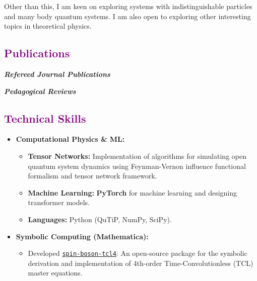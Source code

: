 \documentclass[a4paper,11pt]{article}
\newcommand{\sectionheading}[1]{\subsection*{\textcolor{purple}{#1}}}
\begin{document}
Other than this, I am keen on exploring systems with indistinguishable particles and many body quantum systems. I am also open to exploring other interesting topics in theoretical physics.





\sectionheading{Publications}

\nocite{Kumar2025MF,Kumar2024LHA}

\textbf{\textit{Refereed Journal Publications}}
\printbibliography[heading=none,keyword=refereed]

\textbf{\textit{Pedagogical Reviews}}
\printbibliography[heading=none,keyword=pedagogical]


\sectionheading{Technical Skills}
\begin{itemize}[leftmargin=*]
    \item \textbf{Computational Physics \& ML:} 
    \begin{itemize}
        \item \textbf{Tensor Networks:} Implementation of algorithms for simulating open quantum system dynamics using Feynman-Vernon influence functional formalism and tensor network framework.
        \item \textbf{Machine Learning:} \textbf{PyTorch} for machine learning and designing transformer models.
        \item \textbf{Languages:} Python (QuTiP, NumPy, SciPy).
    \end{itemize}
    \item \textbf{Symbolic Computing (Mathematica):} 
    \begin{itemize}
        \item Developed \href{https://github.com/prem314/spin-boson-tcl4}{\texttt{spin-boson-tcl4}}: An open-source package for the symbolic derivation and implementation of 4th-order Time-Convolutionless (TCL) master equations.
    \end{itemize}
\end{itemize}
\end{document}
